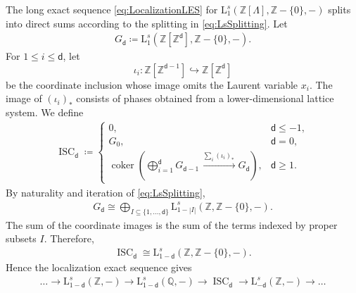 \documentclass[sn-mathphys-num]{sn-jnl}
\theoremstyle{definition}
\numberwithin{equation}{section}
\theoremstyle{definition}
\def\L{{\mbox{L}}}
\def\IQ{\mathbb{Q}}
\def\IZ{{\mathbb{Z}}}
\def\La{{\Lambda}}
\def\coker{\operatorname{coker}}
\def\lr{\longrightarrow}
\newcommand{\dd}{{\mathsf{d}}} %
\begin{document}
The long exact sequence \eqref{eq:LocalizationLES} for
$\L_1^s(\IZ[\La],\IZ\!-\!\{0\},-)$ splits into direct sums according
to the splitting in \eqref{eq:LsSplitting}. Let
\begin{align}
    G_\dd
    \coloneqq
    \L_1^s(\IZ[\IZ^\dd],\IZ\!-\!\{0\},-).
\end{align}
For $1\leqslant i\leqslant\dd$, let
\[
    \iota_i:
    \IZ[\IZ^{\dd-1}]
    \hookrightarrow
    \IZ[\IZ^\dd]
\]
be the coordinate inclusion whose image omits the Laurent variable
$x_i$. The image of $(\iota_i)_*$ consists of phases obtained from a
lower-dimensional lattice system. We define
\begin{align}\label{eq:reduced_phases}
    \operatorname{ISC}_\dd
    \coloneqq
    \begin{cases}
        0,
        & \dd\leqslant-1,\\[1mm]
        G_0,
        & \dd=0,\\[1mm]
        \coker\left(
        \displaystyle\bigoplus_{i=1}^{\dd}G_{\dd-1}
        \xrightarrow{\,\sum_i(\iota_i)_*\,}
        G_\dd
        \right),
        & \dd\geqslant1.
    \end{cases}
\end{align}
By naturality and iteration of \eqref{eq:LsSplitting},
\begin{align}
    G_\dd
    \cong
    \bigoplus_{I\subseteq\{1,\ldots,\dd\}}
    \L_{1-|I|}^s(\IZ,\IZ\!-\!\{0\},-).
\end{align}
The sum of the coordinate images is the sum of the terms indexed by
proper subsets $I$. Therefore,
\begin{align}
    \operatorname{ISC}_\dd
    \cong
    \L_{1-\dd}^s(\IZ,\IZ\!-\!\{0\},-).
\end{align}
Hence the localization exact sequence gives
\begin{align}\label{eq:sequenceCE}
    \ldots\lr \L^{s}_{1-\dd}(\IZ,-)\lr \L^s_{1-\dd}(\IQ,-)\lr \operatorname{ISC}_{\dd}\lr \L^s_{-\dd}(\IZ,-)\lr\ldots
\end{align}
\end{document}
